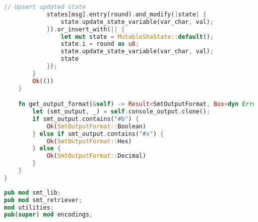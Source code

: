 \begin{lstlisting}[language=rust, caption={structs/benchmark.rs}]
			// Upsert updated state
			states[msg].entry(round).and_modify(|state| {
				state.update_state_variable(var_char, val);
			}).or_insert_with(|| {
				let mut state = MutableShaState::default();
				state.i = round as u8;
				state.update_state_variable(var_char, val);
				state
			});
		}
		Ok(())
	}

	fn get_output_format(&self) -> Result<SmtOutputFormat, Box<dyn Error>> {
		let (smt_output, _) = self.console_output.clone();
		if smt_output.contains("#b") {
			Ok(SmtOutputFormat::Boolean)
		} else if smt_output.contains("#x") {
			Ok(SmtOutputFormat::Hex)
		} else {
			Ok(SmtOutputFormat::Decimal)
		}
	}
}
\end{lstlisting}

\begin{lstlisting}[language=rust, caption={smt\_lib/mod.rs}]
pub mod smt_lib;
pub mod smt_retriever;
mod utilities;
pub(super) mod encodings;
\end{lstlisting}

